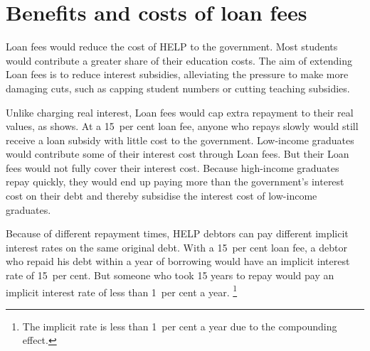 \documentclass[embargoed]{grattan}
\begin{document}
\section{Benefits and costs of loan fees}\label{sec:benefits-and-costs-of-loan-fees}

\Gls{Loan fees} would reduce the cost of \gls{HELP} to the government.
Most students would contribute a greater share of their education costs.
The aim of extending \gls{Loan fees} is to reduce interest subsidies, alleviating the pressure to make more damaging cuts, such as capping student numbers or cutting teaching subsidies.

Unlike charging real interest, \gls{Loan fees} would cap extra repayment to their real values, as  shows.
At a 15~per cent loan fee, anyone who repays slowly would still receive a loan subsidy with little cost to the government.
Low-income graduates would contribute some of their interest cost through \gls{Loan fees}.
But their \gls{Loan fees} would not fully cover their interest cost.
Because high-income graduates repay quickly, they would end up paying more than the government's interest cost on their debt and thereby subsidise the interest cost of low-income graduates.

Because of different repayment times, \gls{HELP} debtors can pay different implicit interest rates on the same original debt.
With a 15~per cent loan fee, a debtor who repaid his debt within a year of borrowing would have an implicit interest rate of 15~per cent.
But someone who took 15 years to repay would pay an implicit interest rate of less than 1~per cent a year.%
\footnote{The implicit rate is less than 1~per cent a year due to the compounding effect.}
\end{document}
